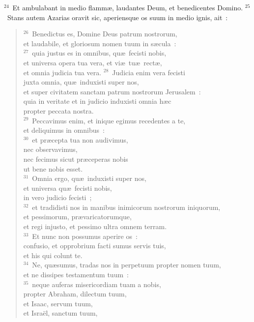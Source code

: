 ${}^{24}$~Et ambulabant in medio flamm\ae , laudantes Deum, et benedicentes Domino.
${}^{25}$~Stans autem Azarias oravit sic, aperiensque os suum in medio ignis, ait~:
\begin{verse}${}^{26}$~Benedictus es, Domine Deus patrum nostrorum,\\ et laudabile, et gloriosum nomen tuum in s\ae cula~:\\
${}^{27}$~quia justus es in omnibus, qu\ae\ fecisti nobis,\\ et universa opera tua vera, et vi\ae\ tu\ae\ rect\ae ,\\ et omnia judicia tua vera.
${}^{28}$~Judicia enim vera fecisti\\ juxta omnia, qu\ae\ induxisti super nos,\\ et super civitatem sanctam patrum nostrorum Jerusalem~:\\ quia in veritate et in judicio induxisti omnia h\ae c\\ propter peccata nostra.\\
${}^{29}$~Peccavimus enim, et inique egimus recedentes a te,\\ et deliquimus in omnibus~:\\
${}^{30}$~et pr\ae cepta tua non audivimus,\\ nec observavimus,\\ nec fecimus sicut pr\ae ceperas nobis\\ ut bene nobis esset.\\
${}^{31}$~Omnia ergo, qu\ae\ induxisti super nos,\\ et universa qu\ae\ fecisti nobis,\\ in vero judicio fecisti~;\\
${}^{32}$~et tradidisti nos in manibus inimicorum nostrorum iniquorum,\\ et pessimorum, pr\ae varicatorumque,\\ et regi injusto, et pessimo ultra omnem terram.\\
${}^{33}$~Et nunc non possumus aperire os~:\\ confusio, et opprobrium facti sumus servis tuis,\\ et his qui colunt te.\\
${}^{34}$~Ne, qu\ae sumus, tradas nos in perpetuum propter nomen tuum,\\ et ne dissipes testamentum tuum~:\\
${}^{35}$~neque auferas misericordiam tuam a nobis,\\ propter Abraham, dilectum tuum,\\ et Isaac, servum tuum,\\ et Isra\"el, sanctum tuum,\\

\end{verse}
